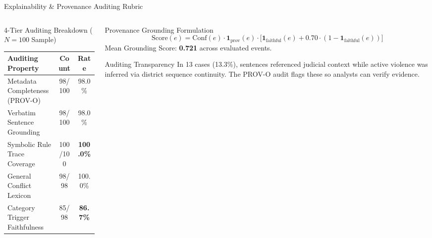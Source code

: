 \documentclass[aspectratio=169, 10pt]{beamer}
\begin{document}
\begin{frame}{Explainability \& Provenance Auditing Rubric}
  \begin{columns}[T]
    \begin{column}{0.48\textwidth}
      \begin{block}{4-Tier Auditing Breakdown ($N=100$ Sample)}
        \centering
        \small
        \begin{tabular}{lcc}
          \toprule
          \textbf{Auditing Property} & \textbf{Count} & \textbf{Rate} \\
          \midrule
          Metadata Completeness (PROV-O) & 98/100 & 98.0\% \\
          Verbatim Sentence Grounding    & 98/100 & 98.0\% \\
          Symbolic Rule Trace Coverage   & 100/100 & \textbf{100.0\%} \\
          General Conflict Lexicon       & 98/98   & 100.0\% \\
          Category Trigger Faithfulness  & 85/98   & \textbf{86.7\%} \\
          \bottomrule
        \end{tabular}
      \end{block}
    \end{column}
    \begin{column}{0.48\textwidth}
      \begin{block}{Provenance Grounding Formulation}
        \footnotesize
        $$\text{Score}(e) = \text{Conf}(e) \cdot \mathbf{1}_{\text{prov}}(e) \cdot \Big[ \mathbf{1}_{\text{faithful}}(e) + 0.70 \cdot (1 - \mathbf{1}_{\text{faithful}}(e)) \Big]$$
        Mean Grounding Score: \textbf{0.721} across evaluated events.
      \end{block}
      \vspace{0.4em}
      \begin{alertblock}{Auditing Transparency}
        \footnotesize
        In 13 cases (13.3\%), sentences referenced judicial context while active violence was inferred via district sequence continuity. The PROV-O audit flags these so analysts can verify evidence.
      \end{alertblock}
    \end{column}
  \end{columns}
\end{frame}
\end{document}
